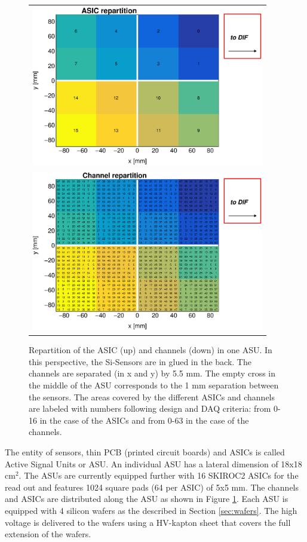 \documentclass[final,3p,times,twocolumn]{elsarticle}
\begin{document}
\begin{figure}[!t]
  \centering
  \begin{tabular}{l}
    \includegraphics[width=4in]{../figs/ASU_geometry1.eps}  \\
    \includegraphics[width=4in]{../figs/ASU_geometry2.eps}  \\
  \end{tabular}
  \caption{Repartition of the ASIC (up) and channels (down) in one ASU. In this perspective, the Si-Sensors are in glued in the back.
    The channels are separated (in x and y) by 5.5 mm.
    The empty cross in the middle of the ASU corresponds to the 1 mm separation between the sensors.
    The areas covered by the different ASICs and channels
    are labeled with numbers following design and DAQ criteria: from 0-16 in the case of the ASICs and from 0-63 in the case of the channels.
  }
\label{ASU}
\end{figure}

The entity
of sensors, thin PCB (printed circuit boards) and ASICs is called Active Signal Units or ASU.
An individual ASU has a lateral dimension of 18x18 cm$^{2}$.
The ASUs are currently equipped
further with 16 SKIROC2 ASICs for the read out and features 1024 square pads (64 per ASIC) of 5x5 mm.
The channels and ASICs are distributed along the ASU as shown in Figure \ref{ASU}. Each ASU is equipped with 4 silicon wafers as the described in Section \ref{sec:wafers}.
The high voltage is delivered to the wafers using a HV-kapton sheet that covers the full extension of the wafers.
\end{document}
